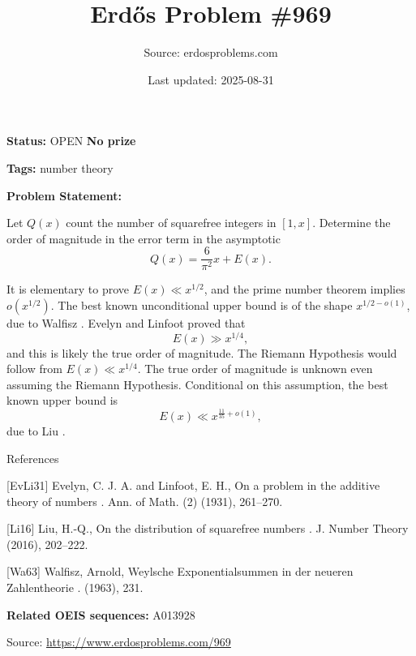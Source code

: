 \documentclass{article}
\title{Erd\H{o}s Problem \#969}
\date{Last updated: 2025-08-31}
\author{Source: erdosproblems.com}
\begin{document}
\maketitle

\noindent\textbf{Status:} OPEN \quad \textbf{No prize}

\noindent\textbf{Tags:} number theory

\medskip

\noindent\textbf{Problem Statement:}

Let $Q(x)$ count the number of squarefree integers in $[1,x]$. Determine the order of magnitude in the error term in the asymptotic\[Q(x)=\frac{6}{\pi^2}x+E(x).\]




It is elementary to prove $E(x)\ll x^{1/2}$, and the prime number theorem implies $o(x^{1/2})$. The best known unconditional upper bound is of the shape $x^{1/2-o(1)}$, due to Walfisz \cite{Wa63}. Evelyn and Linfoot \cite{EvLi31} proved that\[E(x) \gg x^{1/4},\]and this is likely the true order of magnitude. The Riemann Hypothesis would follow from $E(x)\ll x^{1/4}$. The true order of magnitude is unknown even assuming the Riemann Hypothesis. Conditional on this assumption, the best known upper bound is\[E(x)\ll x^{\frac{11}{35}+o(1)},\]due to Liu \cite{Li16}.




References

[EvLi31] Evelyn, C. J. A. and Linfoot, E. H., On a problem in the additive theory of numbers . Ann. of Math. (2) (1931), 261--270.

[Li16] Liu, H.-Q., On the distribution of squarefree numbers . J. Number Theory (2016), 202--222.

[Wa63] Walfisz, Arnold, Weylsche {E}xponentialsummen in der neueren {Z}ahlentheorie . (1963), 231.

\noindent\textbf{Related OEIS sequences:} A013928


\bigskip
\noindent\small{Source: \url{https://www.erdosproblems.com/969}}
\end{document}
